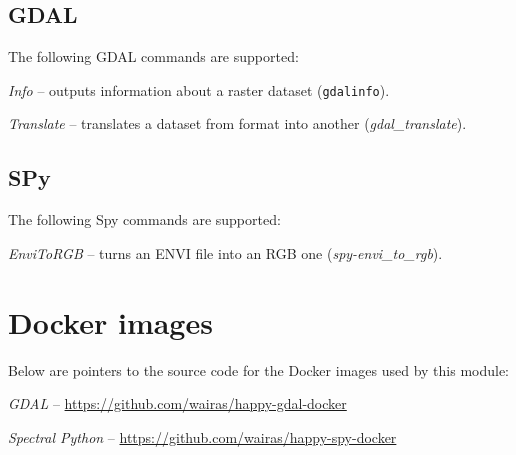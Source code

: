 \documentclass[a4paper]{book}
\begin{document}
\section{GDAL}
The following GDAL commands are supported:
\begin{tight_itemize}
  \item \textit{Info} -- outputs information about a raster dataset (\texttt{gdalinfo}).
  \item \textit{Translate} -- translates a dataset from format into another (\textit{gdal\_translate}).
\end{tight_itemize}


\section{SPy}
The following Spy commands are supported:
\begin{tight_itemize}
  \item \textit{EnviToRGB} -- turns an ENVI file into an RGB one (\textit{spy-envi\_to\_rgb}).
\end{tight_itemize}


\chapter{Docker images}
Below are pointers to the source code for the Docker images used by this module:
\begin{tight_itemize}
  \item \textit{GDAL} -- \url{https://github.com/wairas/happy-gdal-docker}{}
  \item \textit{Spectral Python} -- \url{https://github.com/wairas/happy-spy-docker}{}
\end{tight_itemize}


\end{document}
